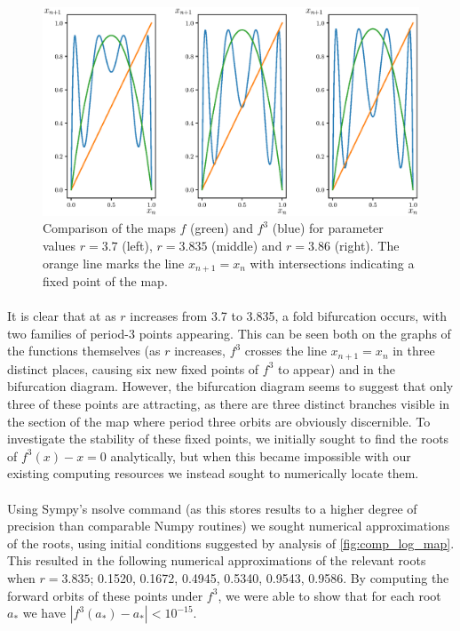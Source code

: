 \documentclass{article}
\begin{document}
\begin{figure}[H]
    \centering
    \includegraphics[scale = 0.7]{Figure_5.eps}
	\caption{Comparison of the maps $f$ (green) and $f^3$ (blue) for parameter values $r = 3.7$ (left), $r = 3.835$ (middle)
    and $r = 3.86$ (right). The orange line marks the line $x_{n+1} = x_n$ with intersections indicating a fixed point of the 
    map.}
    \label{fig:comp_log_map}
\end{figure}

\paragraph{}
It is clear that at as $r$ increases from 3.7 to 3.835, a fold bifurcation occurs, with two families of period-3 points appearing. This can be seen both on 
the graphs of the functions themselves (as $r$ increases, $f^3$ crosses the line $x_{n+1} = x_n$ in three 
distinct places, causing six new fixed points of $f^3$ to appear) and in the bifurcation diagram. 
However, the bifurcation diagram seems to suggest that only three of these points are attracting, as 
there are three distinct branches visible in the section of the map where period three orbits are 
obviously discernible. To investigate the stability of these fixed points, we initially sought to 
find the roots of $f^3(x) - x = 0$ analytically, but when this became impossible with our existing 
computing resources we instead sought 
to numerically locate them. 

\paragraph{}
Using Sympy's nsolve command (as this stores results to a higher degree of precision than comparable 
Numpy routines) we sought numerical approximations of the roots, using initial conditions suggested by analysis of 
\autoref{fig:comp_log_map}. This resulted in the following numerical approximations of the 
relevant roots when $r = 3.835$; 0.1520, 0.1672, 0.4945, 0.5340, 0.9543, 0.9586. By computing 
the forward orbits of these points under $f^3$, we were able to show that for each root $a_*$ we have 
$|f^3(a_*) - a_*| < 10^{-15}$. 
\end{document}
